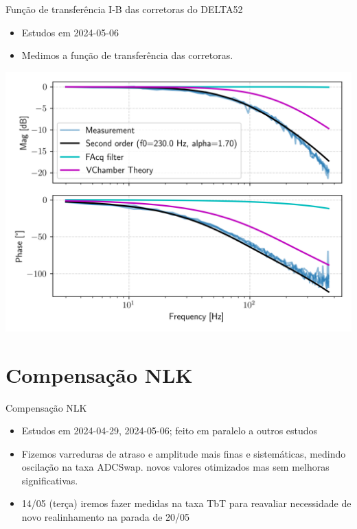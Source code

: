 \documentclass[aspectratio=169]{beamer}            %
\begin{document}
\begin{frame}{Função de transferência I-B das corretoras do DELTA52}
\begin{itemize}
    \item Estudos em 2024-05-06
    \item Medimos a função de transferência das corretoras.
\end{itemize}
\centering
\includegraphics[scale=0.49]{2024-05-31/figures/transfer_function_delta_correctors.png}
\end{frame}



\section{Compensação NLK}

\begin{frame}{Compensação NLK}

\begin{itemize}
    \setlength\itemsep{1em}
    \item Estudos em 2024-04-29, 2024-05-06; feito em paralelo a outros estudos
    \item Fizemos varreduras de atraso e amplitude mais finas e sistemáticas, medindo oscilação na taxa ADCSwap. novos valores otimizados mas sem melhoras significativas.
    \item 14/05 (terça) iremos fazer medidas na taxa TbT para reavaliar necessidade de novo realinhamento na parada de 20/05
\end{itemize}

\end{frame}
\end{document}

